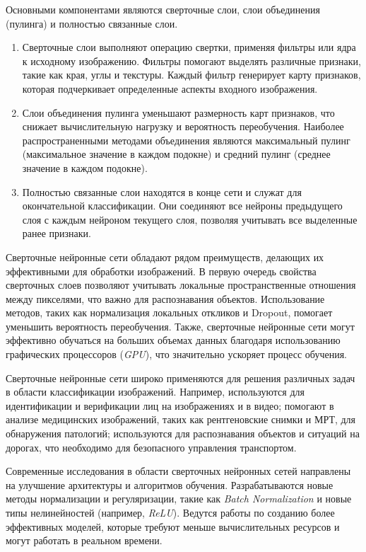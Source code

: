 Основными компонентами являются сверточные слои, слои объединения (пулинга) и полностью связанные слои.
\begin{enumerate}[1.]
    \item Сверточные слои выполняют операцию свертки, применяя фильтры или ядра к исходному изображению. Фильтры помогают выделять различные признаки, такие как края, углы и текстуры. Каждый фильтр генерирует карту признаков, которая подчеркивает определенные аспекты входного изображения.
    \item Слои объединения пулинга уменьшают размерность карт признаков, что снижает вычислительную нагрузку и вероятность переобучения. Наиболее распространенными методами объединения являются максимальный пулинг (максимальное значение в каждом подокне) и средний пулинг (среднее значение в каждом подокне).
    \item Полностью связанные слои находятся в конце сети и служат для окончательной классификации. Они соединяют все нейроны предыдущего слоя с каждым нейроном текущего слоя, позволяя учитывать все выделенные ранее признаки.
\end{enumerate}

Сверточные нейронные сети обладают рядом преимуществ, делающих их эффективными для обработки изображений. В первую очередь свойства сверточных слоев позволяют учитывать локальные пространственные отношения между пикселями, что важно для распознавания объектов. Использование методов, таких как нормализация локальных откликов и Dropout, помогает уменьшить вероятность переобучения. Также, сверточные нейронные сети могут эффективно обучаться на больших объемах данных благодаря использованию графических процессоров (\textit{GPU}), что значительно ускоряет процесс обучения.

Сверточные нейронные сети широко применяются для решения различных задач в области классификации изображений. Например, используются для идентификации и верификации лиц на изображениях и в видео; помогают в анализе медицинских изображений, таких как рентгеновские снимки и МРТ, для обнаружения патологий; используются для распознавания объектов и ситуаций на дорогах, что необходимо для безопасного управления транспортом.

Современные исследования в области сверточных нейронных сетей направлены на улучшение архитектуры и алгоритмов обучения. Разрабатываются новые методы нормализации и регуляризации, такие как \textit{Batch Normalization} и новые типы нелинейностей (например, \textit{ReLU}). Ведутся работы по созданию более эффективных моделей, которые требуют меньше вычислительных ресурсов и могут работать в реальном времени.

